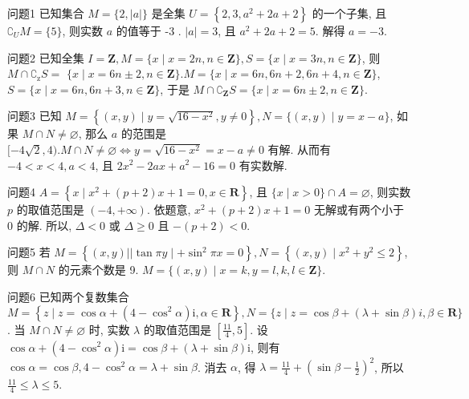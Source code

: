 
问题1 已知集合 $M=\{2,|a|\}$ 是全集 $U=\left\{2,3, a^2+2 a+2\right\}$ 的一个子集, 且 $\complement_U M=\{5\}$, 则实数 $a$ 的值等于
-3 . $|a|=3$, 且 $a^2+2 a+2=5$. 解得 $a=-3$.



问题2 已知全集 $I=\mathbf{Z}, M=\{x \mid x=2 n, n \in \mathbf{Z}\}, S=\{x \mid x=3 n, n \in \mathbf{Z}\}$, 则 $M \cap \complement_{\mathrm{z}} S=$
$\{x \mid x=6 n \pm 2, n \in \mathbf{Z}\} . M=\{x \mid x=6 n, 6 n+2,6 n+4, n \in \mathbf{Z}\}$, $S=\{x \mid x=6 n, 6 n+3, n \in \mathbf{Z}\}$, 于是 $M \cap \complement_{\mathbf{Z}} S=\{x \mid x=6 n \pm 2, n \in \mathbf{Z}\}$.



问题3 已知 $M=\left\{(x, y) \mid y=\sqrt{16-x^2}, y \neq 0\right\}, N=\{(x, y) \mid y=x-a\}$, 如果 $M \cap N \neq \varnothing$, 那么 $a$ 的范围是
$[-4 \sqrt{2}, 4) . M \cap N \neq \varnothing \Leftrightarrow y=\sqrt{16-x^2}=x-a \neq 0$ 有解.
从而有 $-4<x<4, a<4$, 且 $2 x^2-2 a x+a^2-16=0$ 有实数解.



问题4 $A=\left\{x \mid x^2+(p+2) x+1=0, x \in \mathbf{R}\right\}$, 且 $\{x \mid x>0\} \cap A=\varnothing$, 则实数 $p$ 的取值范围是
$(-4,+\infty)$. 依题意, $x^2+(p+2) x+1=0$ 无解或有两个小于 0 的解.
所以, $\Delta<0$ 或 $\Delta \geqslant 0$ 且 $-(p+2)<0$.



问题5 若 $M=\left\{(x, y)|| \tan \pi y \mid+\sin ^2 \pi x=0\right\}, N=\left\{(x, y) \mid x^2+y^2 \leqslant 2\right\}$, 则 $M \cap N$ 的元素个数是
9. $M=\{(x, y) \mid x=k, y=l, k, l \in \mathbf{Z}\}$.



问题6 已知两个复数集合 $M=\left\{z \mid z=\cos \alpha+\left(4-\cos ^2 \alpha\right) \mathrm{i}, \alpha \in \mathbf{R}\right\}, N= \{z \mid z=\cos \beta+(\lambda+\sin \beta) i, \beta \in \mathbf{R}\}$. 当 $M \cap N \neq \varnothing$ 时, 实数 $\lambda$ 的取值范围是
$\left[\frac{11}{4}, 5\right]$. 设 $\cos \alpha+\left(4-\cos ^2 \alpha\right) \mathrm{i}=\cos \beta+(\lambda+\sin \beta) \mathrm{i}$, 则有 $\cos \alpha= \cos \beta, 4-\cos ^2 \alpha=\lambda+\sin \beta$. 消去 $\alpha$, 得 $\lambda=\frac{11}{4}+\left(\sin \beta-\frac{1}{2}\right)^2$, 所以 $\frac{11}{4} \leqslant \lambda \leqslant 5$.



